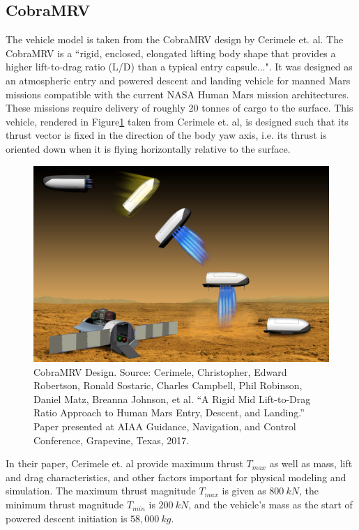 \subsection{CobraMRV} \label{sec:CobraMRV}
The vehicle model is taken from the CobraMRV design by Cerimele et. al\:\cite{CERIMELE}. The CobraMRV is a ``rigid, enclosed, elongated lifting body shape that provides a higher lift-to-drag ratio (L/D) than a typical entry capsule...". It was designed as an atmospheric entry and powered descent and landing vehicle for manned Mars missions compatible with the current NASA Human Mars mission architectures. These missions require delivery of roughly 20 tonnes of cargo to the surface. This vehicle, rendered in Figure\:\ref{fig:CobraMRV} taken from Cerimele et. al, is designed such that its thrust vector is fixed in the direction of the body yaw axis, i.e. its thrust is oriented down when it is flying horizontally relative to the surface. 

\begin{figure}[H]
	\centering
	\begin{minipage}{4.3 in}
		\includegraphics[width=\linewidth]{Figures/CobraMRV.png}
		\caption{CobraMRV Design. Source: Cerimele, Christopher, Edward Robertson, Ronald Sostaric, Charles Campbell,
            Phil Robinson, Daniel Matz, Breanna Johnson, et al. “A Rigid Mid Lift-to-Drag Ratio
            Approach to Human Mars Entry, Descent, and Landing.” Paper presented at AIAA
            Guidance, Navigation, and Control Conference, Grapevine, Texas, 2017. \label{fig:CobraMRV} }
	\end{minipage}
\end{figure}

In their paper, Cerimele et. al\:\cite{CERIMELE} provide maximum thrust $T_{max}$ as well as mass, lift and drag characteristics, and other factors important for physical modeling and simulation. The maximum thrust magnitude $T_{max}$ is given as $800\:kN$, the minimum thrust magnitude $T_{min}$ is $200\:kN$, and the vehicle's mass as the start of powered descent initiation is $58,000\:kg$.

